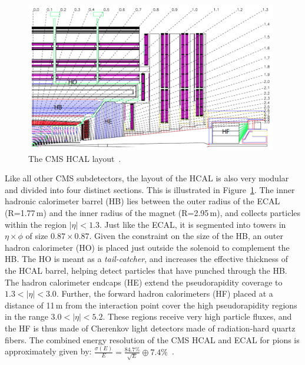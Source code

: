 

\begin{figure}
\begin{center}
  \includegraphics[width=0.98\textwidth,keepaspectratio]{plots_and_figures/chapter3/hcal_layout.png}
\caption{The CMS HCAL layout~\cite{cms_exp_ref}.}
\label{fig:hcal_layout}
\end{center}
\end{figure}

Like all other CMS subdetectors, the layout of the HCAL is also very modular and divided into four distinct sections. This is illustrated in Figure~\ref{fig:hcal_layout}. The inner hadronic calorimeter barrel (HB) lies between the outer radius of the ECAL (R=1.77\,m) and the inner radius of the magnet (R=2.95\,m), and collects particles within the region $|\eta|<1.3$. Just like the ECAL, it is segmented into towers in $\eta\times\phi$ of size $0.87\times0.87$. Given the constraint on the size of the HB, an outer hadron calorimeter (HO) is placed just outside the solenoid to complement the HB. The HO is meant as a \textit{tail-catcher}, and increases the effective thickness of the HCAL barrel, helping detect particles that have punched through the HB. The hadron calorimeter endcaps (HE) extend the pseudorapidity coverage to $1.3 < |\eta| < 3.0$.  Further, the forward hadron calorimeters (HF) placed at a distance of 11\,m from the interaction point cover the high pseudorapidity regions in the range $3.0 < |\eta| < 5.2$. These regions receive very high particle fluxes, and the HF is thus made of Cherenkov light detectors made of radiation-hard quartz fibers. The combined energy resolution of the CMS HCAL and ECAL for pions is approximately given by: $\frac{\sigma(E)}{E}= \frac{84.7\%}{\sqrt{E}}\oplus7.4\%$~\cite{hcal2}.


